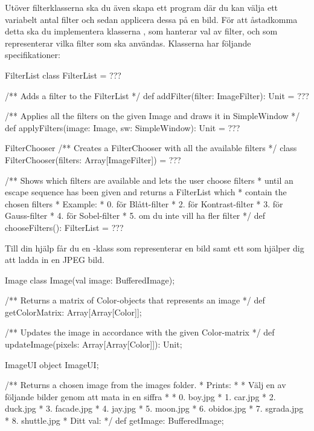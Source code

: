 Utöver filterklasserna ska du även skapa ett program där du kan välja ett variabelt antal filter och sedan applicera dessa på en bild. För att åstadkomma detta ska du implementera klasserna , som hanterar val av filter, och  som representerar vilka filter som ska användas. Klasserna har följande specifikationer:

\begin{ScalaSpec}{FilterList}
class FilterList = ???

/** Adds a filter to the FilterList */
def addFilter(filter: ImageFilter): Unit = ???
  
/** Applies all the filters on the given Image and draws it in SimpleWindow */
def applyFilters(image: Image, sw: SimpleWindow): Unit = ???
\end{ScalaSpec}

\begin{ScalaSpec}{FilterChooser}
/** Creates a FilterChooser with all the available filters */
class FilterChooser(filters: Array[ImageFilter]) = ???
  
/** Shows which filters are available and lets the user choose filters
*   until an escape sequence has been given and returns a FilterList which
*   contain the chosen filters
*   Example: 
*   0. för Blått-filter
*   2. för Kontrast-filter
*   3. för Gauss-filter
*   4. för Sobel-filter
*   5. om du inte vill ha fler filter
*/
def chooseFilters(): FilterList = ???
\end{ScalaSpec}

Till din hjälp får du en -klass som representerar en bild samt ett  som hjälper dig att ladda in en JPEG bild.

\begin{ScalaSpec}{Image}
class Image(val image: BufferedImage);

/** Returns a matrix of Color-objects that represents an image */
def getColorMatrix: Array[Array[Color]];

/** Updates the image in accordance with the given Color-matrix */
def updateImage(pixels: Array[Array[Color]]): Unit;
\end{ScalaSpec}

\begin{ScalaSpec}{ImageUI}
object ImageUI;

/** Returns a chosen image from the images folder.
*   Prints:	
*  
*   Välj en av följande bilder genom att mata in en siffra
*
*   0. boy.jpg
*   1. car.jpg
*   2. duck.jpg
*   3. facade.jpg
*   4. jay.jpg
*   5. moon.jpg
*   6. obidos.jpg
*   7. sgrada.jpg
*   8. shuttle.jpg
*   Ditt val: 
*/
def getImage: BufferedImage;
\end{ScalaSpec}


